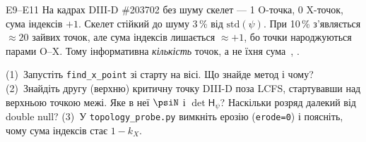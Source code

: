 \begin{established}{E9--E11}
На кадрах DIII-D \#203702 без шуму скелет --- 1 O-точка, 0 X-точок, сума індексів $+1$. Скелет стійкий до шуму 3\,\% від $\mathrm{std}(\psi)$. При 10\,\% з'являється $\approx20$ зайвих точок, але сума індексів лишається $\approx+1$, бо точки народжуються парами O--X. Тому інформативна \emph{кількість} точок, а не їхня сума~\cite{RegEst}, \cite[розд.~4]{Manual}.
\end{established}

\begin{practicum}[топологія]
(1)~Запустіть \texttt{find\_x\_point} зі старту на вісі. Що знайде метод і чому? (2)~Знайдіть другу (верхню) критичну точку DIII-D поза LCFS, стартувавши над верхньою точкою межі. Яке в неї $\psiN$ і $\det\mathsf{H}_\psi$? Наскільки розряд далекий від double null? (3)~У \texttt{topology\_probe.py} вимкніть ерозію (\texttt{erode=0}) і поясніть, чому сума індексів стає $1-k_X$.
\end{practicum}
